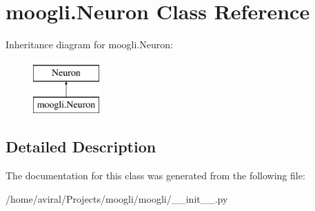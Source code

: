 \hypertarget{classmoogli_1_1Neuron}{\section{moogli.\-Neuron Class Reference}
\label{classmoogli_1_1Neuron}
}
Inheritance diagram for moogli.\-Neuron\-:\begin{figure}[H]
\begin{center}
\leavevmode
\includegraphics[height=2.000000cm]{classmoogli_1_1Neuron}
\end{center}
\end{figure}


\subsection{Detailed Description}


The documentation for this class was generated from the following file\-:\begin{DoxyCompactItemize}
\item 
/home/aviral/\-Projects/moogli/moogli/\-\_\-\-\_\-init\-\_\-\-\_\-.\-py\end{DoxyCompactItemize}
